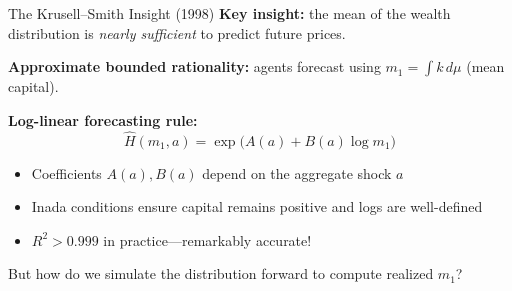 \documentclass[aspectratio=169,11pt]{beamer}
\newcommand{\emphc}[1]{\textcolor{harvardcrimson}{#1}}
\begin{document}
\begin{frame}{The Krusell--Smith Insight (1998)}
\textbf{Key insight:} the \emphc{mean} of the wealth distribution is \emph{nearly sufficient} to predict future prices.

\vspace{0.5em}
\textbf{Approximate bounded rationality:} agents forecast using $m_1 = \int k \, d\mu$ (mean capital).

\vspace{0.5em}
\textbf{Log-linear forecasting rule:}
\[
\boxed{\hat{H}(m_1, a) = \exp\!\bigl(A(a) + B(a) \log m_1\bigr)}
\]

\vspace{0.3em}
\begin{itemize}
    \item Coefficients $A(a), B(a)$ depend on the aggregate shock $a$
    \item Inada conditions ensure capital remains positive and logs are well-defined
    \item $R^2 > 0.999$ in practice---remarkably accurate!
\end{itemize}

\vspace{0.3em}
{\small But \emphc{how do we simulate} the distribution forward to compute realized $m_1$?}
\end{frame}
\end{document}
